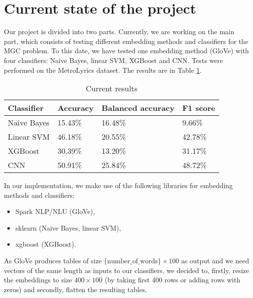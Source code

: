 \section{Current state of the project}
Our project is divided into two parts. Currently, we are working on the main part, which consists of testing different embedding methods and classifiers for the MGC problem. To this date, we have tested one embedding method (GloVe) with four classifiers: Naive Bayes, linear SVM, XGBoost and CNN. Tests were performed on the MetroLyrics dataset. The results are in Table \ref{tab:results}.

\begin{table}[h]
\centering
\begin{tabularx}{0.52\textwidth}{lXXX}
\textbf{Classifier} & \textbf{Accuracy} & \textbf{Balanced accuracy} & \textbf{F1 score} \\\hline
Naive Bayes & 15.43\% & 16.48\% & 9.66\% \\
Linear SVM & 46.18\% & 20.55\% & 42.78\% \\
XGBoost & 30.39\% & 13.20\% & 31.17\% \\
CNN & 50.91\% & 25.84\% & 48.72\% \\
\end{tabularx}
\caption{Current results}
\label{tab:results}
\end{table}

In our implementation, we make use of the following libraries for embedding methods and classifiers:
\begin{itemize}
    \item Spark NLP/NLU (GloVe),
    \item sklearn (Naive Bayes, linear SVM),
    \item xgboost (XGBoost).
\end{itemize}

As GloVe produces tables of size $\{\textrm{number\_of\_words}\}\times 100$ as output and we need vectors of the same length as inputs to our classifiers, we decided to, firstly, resize the embeddings to size $400\times 100$ (by taking first 400 rows or adding rows with zeros) and secondly, flatten the resulting tables.